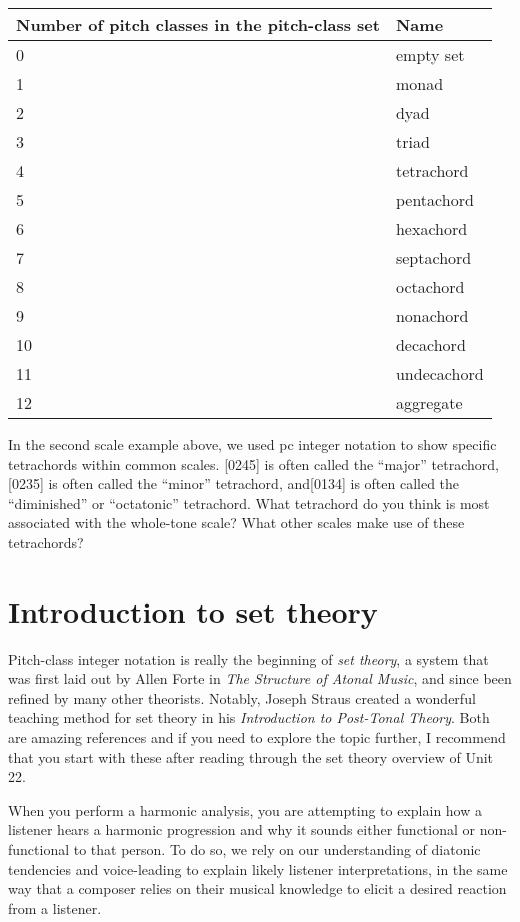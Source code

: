 \documentclass{book}
\begin{document}
\begin{longtable}[]{@{}ll@{}}
\toprule
Number of pitch classes in the pitch-class set & Name \\
\midrule
\endhead
0 & empty set \\
1 & monad \\
2 & dyad \\
3 & triad \\
4 & tetrachord \\
5 & pentachord \\
6 & hexachord \\
7 & septachord \\
8 & octachord \\
9 & nonachord \\
10 & decachord \\
11 & undecachord \\
12 & aggregate \\
\bottomrule
\end{longtable}

In the second scale example above, we used pc integer notation to show
specific tetrachords within common scales. {[}0245{]} is often called the
``major'' tetrachord, {[}0235{]} is often called the ``minor'' tetrachord,
and{[}0134{]} is often called the ``diminished'' or ``octatonic'' tetrachord.
What tetrachord do you think is most associated with the whole-tone scale?
What other scales make use of these tetrachords?

\hypertarget{introduction-to-set-theory}{%
\section{Introduction to set theory}\label{introduction-to-set-theory}}

Pitch-class integer notation is really the beginning of \emph{set theory}, a
system that was first laid out by Allen Forte in \emph{The Structure of Atonal
Music}, and since been refined by many other theorists. Notably, Joseph Straus
created a wonderful teaching method for set theory in his \emph{Introduction
to Post-Tonal Theory}. Both are amazing references and if you need to explore
the topic further, I recommend that you start with these after reading through
the set theory overview of Unit 22.

When you perform a harmonic analysis, you are attempting to explain how a
listener hears a harmonic progression and why it sounds either functional or
non-functional to that person. To do so, we rely on our understanding of
diatonic tendencies and voice-leading to explain likely listener
interpretations, in the same way that a composer relies on their musical
knowledge to elicit a desired reaction from a listener.
\end{document}
